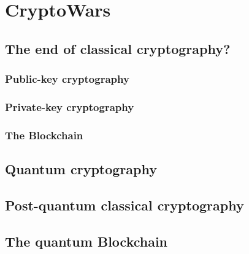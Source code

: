 %
%

\section{CryptoWars\texttrademark}



\subsection{The end of classical cryptography?}

\subsubsection{Public-key cryptography}

\subsubsection{Private-key cryptography}


\subsubsection{The Blockchain}

\subsection{Quantum cryptography}

\subsection{Post-quantum classical cryptography}

\subsection{The quantum Blockchain}